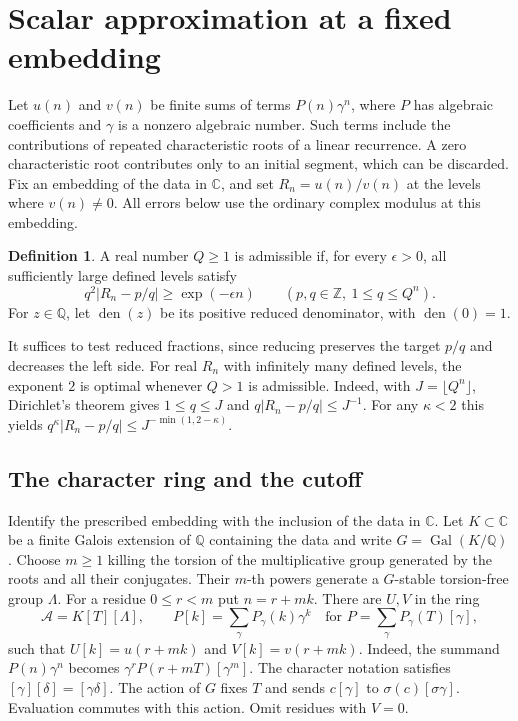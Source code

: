 \documentclass[11pt,a4paper,reqno]{amsart}
\theoremstyle{definition}
\newtheorem{definition}[theorem]{Definition}
\theoremstyle{remark}
\numberwithin{equation}{section}
\begin{document}
\section{Scalar approximation at a fixed embedding}
\label{sec:algscalar}

Let \(u(n)\) and \(v(n)\) be finite sums of terms \(P(n)\gamma^n\),
where \(P\) has algebraic coefficients and \(\gamma\) is a nonzero
algebraic number. Such terms include the contributions of repeated
characteristic roots of a linear recurrence. A zero characteristic
root contributes only to an initial segment, which can be discarded.
Fix an embedding of the data in \(\mathbb C\), and set \(R_n=u(n)/v(n)\)
at the levels where \(v(n)\ne0\). All errors below use the ordinary
complex modulus at this embedding.

\begin{definition}
A real number \(Q\ge1\) is admissible if, for every \(\epsilon>0\),
all sufficiently large defined levels satisfy
\begin{equation}\label{eq:alg-admissibility}
 q^2|R_n-p/q|\ge \exp(-\epsilon n)
 \qquad(p,q\in\mathbb Z,\ 1\le q\le Q^n).
\end{equation}
For \(z\in\mathbb Q\), let \(\operatorname{den}(z)\) be its positive
reduced denominator, with \(\operatorname{den}(0)=1\).
\end{definition}

It suffices to test reduced fractions, since reducing preserves the
target \(p/q\) and decreases the left side. For real \(R_n\) with
infinitely many defined levels, the exponent \(2\) is optimal whenever
\(Q>1\) is admissible. Indeed, with \(J=\lfloor Q^n\rfloor\),
Dirichlet's theorem gives \(1\le q\le J\) and
\(q|R_n-p/q|\le J^{-1}\). For any \(\kappa<2\) this yields
\(q^\kappa|R_n-p/q|\le J^{-\min(1,2-\kappa)}\).

\subsection{The character ring and the cutoff}

Identify the prescribed embedding with the inclusion of the data in
\(\mathbb C\). Let \(K\subset\mathbb C\) be a finite Galois extension of
\(\mathbb Q\) containing the data and write
\(G=\operatorname{Gal}(K/\mathbb Q)\). Choose \(m\ge1\) killing the
torsion of the multiplicative group generated by the roots and all
their conjugates. Their \(m\)-th powers generate a \(G\)-stable
torsion-free group \(\Lambda\). For a residue \(0\le r<m\) put
\(n=r+mk\). There are \(U,V\) in the ring
\[
 \mathcal A=K[T][\Lambda],\qquad
 P[k]=\sum_{\gamma}P_\gamma(k)\gamma^k
 \quad\text{for } P=\sum_\gamma P_\gamma(T)[\gamma],
\]
such that \(U[k]=u(r+mk)\) and \(V[k]=v(r+mk)\).
Indeed, the summand \(P(n)\gamma^n\) becomes
\(\gamma^r P(r+mT)[\gamma^m]\). The character notation satisfies
\([\gamma][\delta]=[\gamma\delta]\). The action of \(G\) fixes \(T\) and
sends \(c[\gamma]\) to \(\sigma(c)[\sigma\gamma]\). Evaluation commutes
with this action. Omit residues with \(V=0\).
\end{document}
